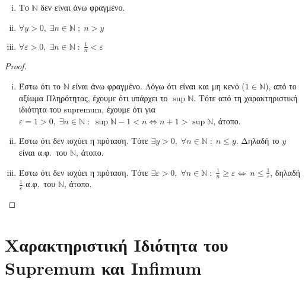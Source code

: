 \documentclass[main.tex]{subfiles}
\begin{document}
\begin{mypropbox}
  \begin{enumerate}[(i)]
    \item Το $ \mathbb{N} $ δεν είναι άνω φραγμένο.
    \item $ \forall y > 0, \; \exists n \in \mathbb{N} \; ; \; n > y$
    \item $ \forall \varepsilon >0, \; \exists n \in \mathbb{N} \; : 
      \; \frac{1}{n} < \varepsilon$
  \end{enumerate}
\end{mypropbox}
\begin{proof}
\item {}
  \begin{enumerate}[(i)]
    \item Έστω ότι το $ \mathbb{N} $ είναι άνω φραγμένο. Λόγω ότι 
      είναι και μη κενό ($ 1 \in \mathbb{N} $), από το αξίωμα 
      Πληρότητας, έχουμε ότι υπάρχει το $ \sup \mathbb{N} $. 
      Τότε από τη χαρακτηριστική ιδιότητα του supremum, έχουμε 
      ότι για $ \varepsilon = 1 >0, \; \exists n \in \mathbb{N} 
      \; : \; \sup \mathbb{N}-1 < n \Leftrightarrow n+1 > \sup
      \mathbb{N} $, άτοπο.

    \item Έστω ότι δεν ισχύει η πρόταση. Τότε  $ \exists y >0, \; 
      \forall n \in \mathbb{N} \; : \; n \leq y$. Δηλαδή
      το  $y$  είναι α.φ.\ του $\mathbb{N}$, άτοπο.

    \item Έστω ότι δεν ισχύει η πρόταση. Τότε $ \exists 
      \varepsilon >0 , \; \forall n \in \mathbb{N} \; : \; 
      \frac{1}{n} \geq \varepsilon  \Leftrightarrow \ n \leq 
      \frac{1}{\varepsilon} $, δηλαδή $ \frac{1}{\varepsilon} $ 
      α.φ.\ του $ \mathbb{N} $, άτοπο. 
  \end{enumerate}
\end{proof}

\section{Χαρακτηριστική Ιδιότητα του Supremum και Infimum}
\end{document}

